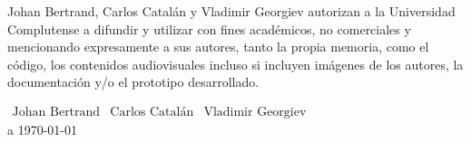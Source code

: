 Johan Bertrand, Carlos Catalán y Vladimir Georgiev autorizan a la Universidad Complutense a difundir y utilizar con fines académicos, no comerciales y mencionando expresamente a sus autores, tanto la propia memoria, como el código, los contenidos audiovisuales incluso si incluyen imágenes de los autores, la documentación y/o el prototipo desarrollado.\\
\begin{center}
	\vspace{5.5in}

	\large

	
	$\begin{array}{ccc}
		\text{Johan Bertrand} & \text{Carlos Catalán} & \text{Vladimir Georgiev}
	\end{array}$\\
	\vspace{0.4in} a \today
\end{center}

\normalsize


